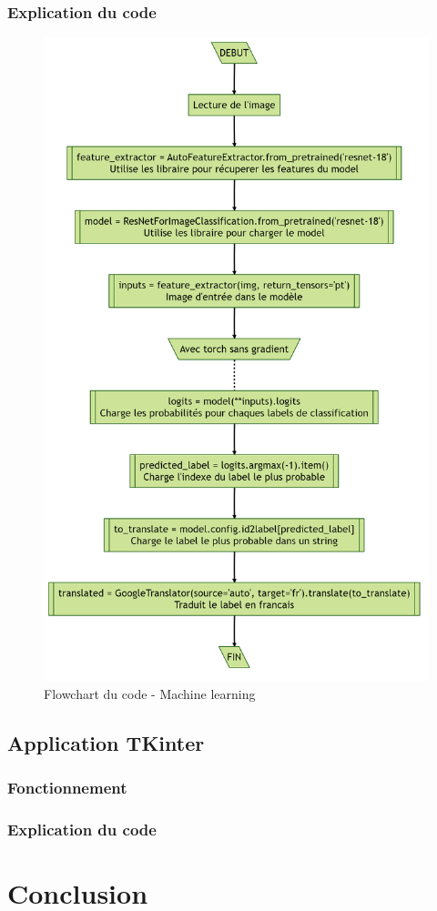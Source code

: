 \subsubsection{Explication du code}

\begin{figure}[h]
	\centering
	\includegraphics[width=0.483\linewidth]{../Flowcharts/output}
	\caption{Flowchart du code - Machine learning}
	\label{fig:output}
\end{figure}


\clearpage	
\subsection{Application TKinter}

\subsubsection{Fonctionnement}

\subsubsection{Explication du code}

\clearpage
\section{Conclusion}

